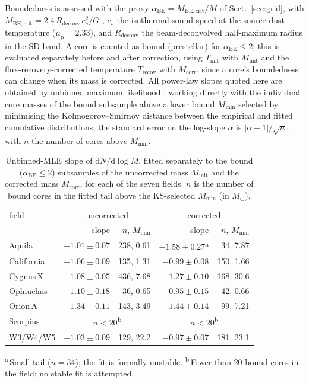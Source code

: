 \documentclass[11pt,a4paper]{article}
\providecommand{\tablefootmark}[1]{\textsuperscript{#1}}
\providecommand{\tablefoottext}[2]{\textsuperscript{#1}\,#2}
\providecommand{\tablefoot}[1]{\vspace{2pt}\par\footnotesize #1}
\newcommand{\msun}{M_{\odot}}
\begin{document}
Boundedness is assessed with the proxy $\alpha_{\mathrm{BE}}=M_{\mathrm{BE,crit}}/M$
of Sect.~\ref{sec:grid}, with $M_{\mathrm{BE,crit}}=2.4\,R_{\mathrm{deconv}}
\,c_s^2/G$ \citep{Konyves+2015}, $c_s$ the isothermal sound speed at the source
dust temperature ($\mu_{\mathrm p}=2.33$), and $R_{\mathrm{deconv}}$ the
beam-deconvolved half-maximum radius in the SD band. A core is counted as
bound (prestellar) for $\alpha_{\mathrm{BE}}\le2$; this is evaluated
separately before and after correction, using $T_{\mathrm{init}}$ with
$M_{\mathrm{init}}$ and the flux-recovery-corrected temperature
$T_{\mathrm{recov}}$ with $M_{\mathrm{corr}}$, since a core's boundedness can
change when its mass is corrected. All power-law slopes quoted here are
obtained by unbinned maximum likelihood \citep{Clauset+2009}, working
directly with the individual core masses of the bound subsample above a
lower bound $M_{\mathrm{min}}$ selected by minimising the Kolmogorov--Smirnov
distance between the empirical and fitted cumulative distributions; the
standard error on the log-slope $\alpha$ is $|\alpha-1|/\sqrt{n}$, with $n$
the number of cores above $M_{\mathrm{min}}$.

\begin{table}
\caption{Unbinned-MLE slope of $\mathrm{d}N/\mathrm{d}\log M$, fitted
separately to the bound ($\alpha_{\mathrm{BE}}\le2$) subsamples of the
uncorrected mass $M_{\mathrm{init}}$ and the corrected mass $M_{\mathrm{corr}}$,
for each of the seven fields. $n$ is the number of bound cores in the fitted
tail above the KS-selected $M_{\mathrm{min}}$ (in $\msun$).}
\label{tab:cmfslopes}
\centering
\begin{tabular}{lrrrr}
\hline
field & \multicolumn{2}{c}{uncorrected} & \multicolumn{2}{c}{corrected} \\
 & slope & $n$, $M_{\mathrm{min}}$ & slope & $n$, $M_{\mathrm{min}}$ \\
\hline
Aquila     & $-1.01\pm0.07$ & 238, 0.61 & $-1.58\pm0.27$\tablefootmark{a} & 34, 7.87 \\
California & $-1.06\pm0.09$ & 135, 1.31 & $-0.99\pm0.08$ & 150, 1.66 \\
Cygnus\,X  & $-1.08\pm0.05$ & 436, 7.68 & $-1.27\pm0.10$ & 168, 30.6 \\
Ophiuchus  & $-1.10\pm0.18$ &  36, 0.65 & $-0.95\pm0.15$ &  42, 0.66 \\
Orion\,A   & $-1.34\pm0.11$ & 143, 3.49 & $-1.44\pm0.14$ &  99, 7.21 \\
Scorpius   & \multicolumn{2}{c}{$n<20$\tablefootmark{b}} & \multicolumn{2}{c}{$n<20$\tablefootmark{b}} \\
W3/W4/W5   & $-1.03\pm0.09$ & 129, 22.2 & $-0.97\pm0.07$ & 181, 23.1 \\
\hline
\end{tabular}
\tablefoot{
\tablefoottext{a}{Small tail ($n=34$); the fit is formally unstable.}
\tablefoottext{b}{Fewer than 20 bound cores in the field; no stable fit is
attempted.}
}
\end{table}
\end{document}
